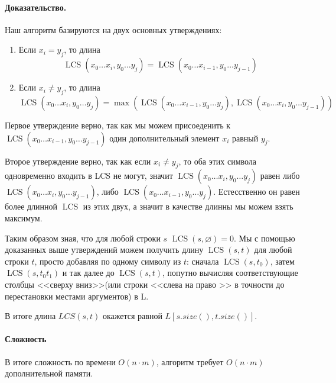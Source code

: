 \documentclass[12pt]{article}
\newcommand{\LCS}{\operatorname{LCS}}
\begin{document}
\paragraph{Доказательство.}
Наш алгоритм базируются на двух основных утверждениях:
\begin{enumerate}
    \item Если $ x_i = y_j $, то длина $$ \LCS(x_0 \dots x_i, y_0 \dots y_j) = 
    \LCS(x_0 \dots x_{i - 1}, y_0 \dots y_{j - 1}) $$
    
    \item Если $ x_i \ne y_j $, то длина $$ \LCS(x_0 \dots x_i, y_0 \dots y_j) =
    \max(\LCS(x_0 \dots x_{i - 1}, y_0 \dots y_j), \LCS(x_0 \dots x_i, y_0
    \dots y_{j - 1})) $$
\end{enumerate}

Первое утверждение верно, так как мы можем присоеденить к 
$ \LCS(x_0 \dots x_{i - 1}, y_0 \dots y_{j - 1}) $ один дополнительный элемент
$ x_i $ равный $ y_j $.

Второе утверждение верно, так как если $ x_i \ne y_j $, то оба этих символа
одновременно входить в LCS не могут, значит $ \LCS(x_0 \dots x_i, y_0 \dots y_j)$
равен либо $ \LCS(x_0 \dots x_i, y_0 \dots y_{j - 1}) $, либо
$ \LCS(x_0 \dots x_{i - 1}, y_0 \dots y_j) $. Естесственно он равен более длинной
$ \LCS $ из этих двух, а значит в качестве длинны мы можем взять максимум.

Таким образом зная, что для любой строки $ s $ $ \LCS(s, \varnothing) = 0 $.
Мы с помощью доказанных выше утверждений можем получить длину $ \LCS(s, t) $ 
для любой строки $ t $, просто добавляя по одному символу из $ t $: сначала 
$ \LCS(s, t_0) $, затем $ \LCS(s, t_0t_1) $ и так далее до $ \LCS(s, t) $,
попутно вычисляя соответствующие столбцы <<сверху вниз>>(или строки <<слева на 
право >> в точности до перестановки местами аргументов) в L.

В итоге длина $ LCS(s , t) $ окажется равной $ L[s.size(), t.size()] $.

\paragraph{Сложность}
В итоге сложность по времени $ O(n \cdot m) $, алгоритм требует $ O(n \cdot m) $ дополнительной памяти.
\end{document}
